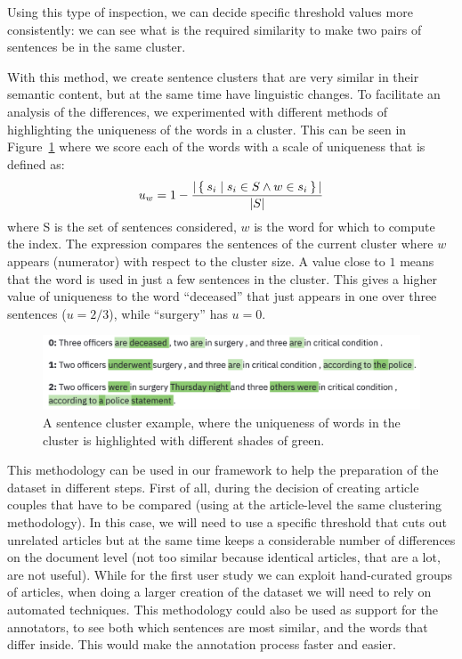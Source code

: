 Using this type of inspection, we can decide specific threshold values more consistently: we can see what is the required similarity to make two pairs of sentences be in the same cluster.

With this method, we create sentence clusters that are very similar in their semantic content, but at the same time have linguistic changes.
To facilitate an analysis of the differences, we experimented with different methods of highlighting the uniqueness of the words in a cluster.
This can be seen in Figure~\ref{fig:words_uniqueness} where we score each of the words with a scale of uniqueness that is defined as:
$$u_w = 1 - \frac{|\Set{s_i | s_i \in S \land w \in s_i}|}{|S|}$$
where S is the set of sentences considered, $w$ is the word for which to compute the index. The expression compares the sentences of the current cluster where $w$ appears (numerator) with respect to the cluster size.
A value close to $1$ means that the word is used in just a few sentences in the cluster.
This gives a higher value of uniqueness to the word ``deceased'' that just appears in one over three sentences ($u = 2/3$), while ``surgery'' has $u = 0$.

\begin{figure}[!htb]
    \centering
    \includegraphics[width=\textwidth]{figures/words_uniqueness.png}
    \caption{A sentence cluster example, where the uniqueness of words in the cluster is highlighted with different shades of green.}
    \label{fig:words_uniqueness}
\end{figure}



This methodology can be used in our framework to help the preparation of the dataset in different steps.
First of all, during the decision of creating article couples that have to be compared (using at the article-level the same clustering methodology). In this case, we will need to use a specific threshold that cuts out unrelated articles but at the same time keeps a considerable number of differences on the document level (not too similar because identical articles, that are a lot, are not useful).
While for the first user study we can exploit hand-curated groups of articles, when doing a larger creation of the dataset we will need to rely on automated techniques.
This methodology could also be used as support for the annotators, to see both which sentences are most similar, and the words that differ inside. This would make the annotation process faster and easier.

